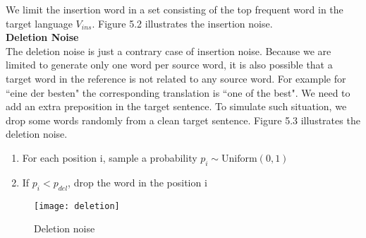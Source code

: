 	We limit the insertion word in a set consisting of the top frequent word in the target language ${V_{ins}}$. Figure 5.2 illustrates the insertion noise.\\
	
	




	\textbf{Deletion Noise}\\
	The deletion noise is just a contrary case of insertion noise.
	Because we are limited to generate only one word per source word, it is also possible that a target word in the reference is not related to any source word.  For example for ``eine der besten" the corresponding translation is ``one of the best". We need to add an extra preposition in the target sentence.  To simulate such situation, we drop some words randomly from a clean target sentence. Figure 5.3 illustrates the deletion noise.\\
	
	\begin{enumerate}
		\item For each position i, sample a probability ${p_i \sim \textrm{Uniform}(0,1)}$
		\item If ${p_i} < p_{del}$, drop the word in the position i
	\end{enumerate}
	
		\begin{figure}[h]
		\texttt{[image: deletion]}
		\caption{ Deletion noise}
		\centering
	\end{figure}

	
	
	
	
	
	
	
	
	
	
	
	
	
	
	
	
	
	
	
	
	
	
	
	
	
	
	
	